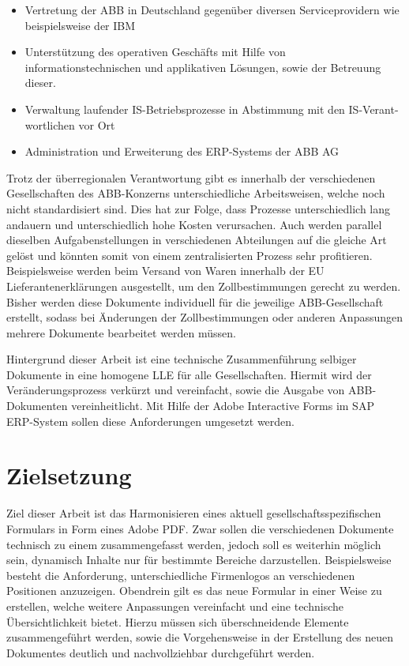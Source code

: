 \begin{itemize}
	\item Vertretung der \ac{ABB} in Deutschland gegenüber diversen Serviceprovidern wie beispielsweise der \ac{IBM}
	\item Unterstützung des operativen Geschäfts mit Hilfe von informationstechnischen und applikativen  Lösungen, sowie der Betreuung dieser.
	\item Verwaltung laufender IS-Betriebsprozesse in Abstimmung mit den IS-Verant-wortlichen vor Ort
	\item Administration und Erweiterung des \ac{ERP}-Systems der \ac{ABB} AG
\end{itemize}


 Trotz der überregionalen Verantwortung gibt es innerhalb der verschiedenen Gesellschaften des \ac{ABB}-Konzerns unterschiedliche Arbeitsweisen, welche noch nicht standardisiert sind. Dies hat zur Folge, dass Prozesse unterschiedlich lang andauern und unterschiedlich hohe Kosten verursachen. Auch werden parallel dieselben Aufgabenstellungen in verschiedenen Abteilungen auf die gleiche Art gelöst und könnten somit von einem zentralisierten Prozess sehr profitieren. Beispielsweise werden beim Versand von Waren innerhalb der \ac{EU} Lieferantenerklärungen ausgestellt, um den Zollbestimmungen gerecht zu werden. Bisher werden diese Dokumente individuell für die jeweilige ABB-Gesellschaft erstellt, sodass bei Änderungen der Zollbestimmungen oder anderen Anpassungen mehrere Dokumente bearbeitet werden müssen.
 
 Hintergrund dieser Arbeit ist eine technische Zusammenführung selbiger Dokumente in eine homogene \acf{LLE} für alle Gesellschaften. Hiermit wird der Veränderungsprozess verkürzt und vereinfacht, sowie die Ausgabe von \ac{ABB}-Dokumenten vereinheitlicht. Mit Hilfe der Adobe Interactive Forms im SAP ERP-System sollen diese Anforderungen umgesetzt werden.

\section{Zielsetzung}

Ziel dieser Arbeit ist das Harmonisieren eines aktuell gesellschaftsspezifischen Formulars in Form eines Adobe \ac{PDF}. Zwar sollen die verschiedenen Dokumente technisch zu einem zusammengefasst werden, jedoch soll es weiterhin möglich sein, dynamisch Inhalte nur für bestimmte Bereiche darzustellen. Beispielsweise besteht die Anforderung, unterschiedliche Firmenlogos an verschiedenen Positionen anzuzeigen. Obendrein gilt es das neue Formular in einer Weise zu erstellen, welche weitere Anpassungen vereinfacht und eine technische Übersichtlichkeit bietet.
Hierzu müssen sich überschneidende Elemente zusammengeführt werden, sowie die Vorgehensweise in der Erstellung des neuen Dokumentes deutlich und nachvollziehbar durchgeführt werden.

